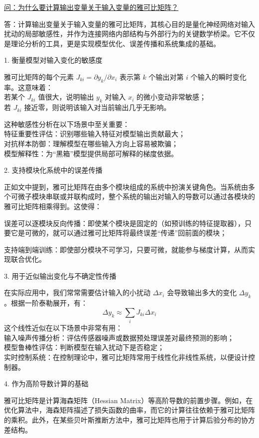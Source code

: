 \documentclass{article}
\begin{document}
{\color{blue}
\underline{问：为什么要计算输出变量关于输入变量的雅可比矩阵？}

答：计算输出变量关于输入变量的雅可比矩阵，其核心目的是量化神经网络对输入扰动的局部敏感性，并作为连接网络内部结构与外部行为的关键数学桥梁。它不仅是理论分析的工具，更是实现模型优化、误差传播和系统集成的基础。

1. 衡量模型对输入变化的敏感度

雅可比矩阵的每个元素 $J_{ki} = \partial y_k / \partial x_i$ 表示第 $k$ 个输出对第 $i$ 个输入的瞬时变化率。这意味着：\\ 
若某个 $J_{ki}$ 值很大，说明输出 $y_k$ 对输入 $x_i$ 的微小变动非常敏感；\\
若 $J_{ki}$ 接近零，则说明该输入对当前输出几乎无影响。

这种敏感性分析在以下场景中至关重要：\\
特征重要性评估：识别哪些输入特征对模型输出贡献最大；\\
对抗样本防御：理解模型在哪些输入方向上容易被欺骗；\\
模型解释性：为“黑箱”模型提供局部可解释的梯度依据。

2. 支持模块化系统中的误差传播

正如文中提到，雅可比矩阵在由多个模块组成的系统中扮演关键角色。当系统由多个可微子模块串联或并联构成时，整个系统的输出对输入的导数可以通过各模块的雅可比矩阵相乘得到。这使得：

误差可以逐模块反向传播：即使某个模块是固定的（如预训练的特征提取器），只要它是可微的，就可以通过雅可比矩阵将最终误差“传递”回前面的模块；

支持端到端训练：即使部分模块不可学习，只要可微，就能参与梯度计算，从而实现联合优化。

3. 用于近似输出变化与不确定性传播

在实际应用中，我们常常需要估计输入的小扰动 $\Delta x_i$ 会导致输出多大的变化 $\Delta y_k$。根据一阶泰勒展开，有：
$$
\Delta y_k \approx \sum_i J_{ki} \Delta x_i
$$
这个线性近似在以下场景中非常有用：\\
输入噪声传播分析：评估传感器噪声或数据预处理误差对最终预测的影响；\\
模型鲁棒性评估：判断模型在输入扰动下是否稳定；\\
实时控制系统：在控制理论中，雅可比矩阵常用于线性化非线性系统，以便设计控制器。

4. 作为高阶导数计算的基础

雅可比矩阵是计算海森矩阵（Hessian Matrix）等高阶导数的前置步骤。例如，在优化算法中，海森矩阵描述了损失函数的曲率，而它的计算往往依赖于雅可比矩阵的乘积。此外，在某些贝叶斯推断方法中，雅可比矩阵也用于计算后验分布的协方差结构。
}
\end{document}
